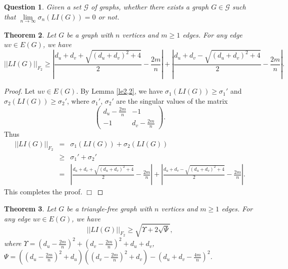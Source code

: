 \documentclass[12pt, a4paper]{article}
\newtheorem{theorem}{Theorem}[section]
\newtheorem{question}[theorem]{Question}
\begin{document}
\begin{question}\label{qu3,2} %
Given a set $\mathcal{G}$ of graphs, whether there exists a graph $G\in \mathcal{G}$ such that $\lim\limits_{n\rightarrow \infty}\sigma_{n}(LI(G))=0$ or not.
\end{question}



\begin{theorem}\label{th3,3} %
Let $G$ be a graph with $n$ vertices and $m\geq 1$ edges. For any edge $uv\in E(G)$, we have
$$||LI(G)||_{F_2}\geq \left\lvert \frac{d_u+d_v+\sqrt{(d_u+d_v)^2+4}}{2}-\frac{2m}{n}\right\lvert+\left\lvert \frac{d_u+d_v-\sqrt{(d_u+d_v)^2+4}}{2}-\frac{2m}{n}\right\lvert.$$
\end{theorem}


\begin{proof}  Let $uv\in E(G)$. By Lemma \ref{le2,2}, we have $\sigma_1(LI(G))\geq \sigma_1'$ and $\sigma_2(LI(G))\geq \sigma_2'$, where $\sigma_1'$, $\sigma_2'$ are the singular values of the matrix
$$\begin{pmatrix}
d_u-\frac{2m}{n} & -1\\
-1 & d_v-\frac{2m}{n}
\end{pmatrix}.$$
Thus
\begin{eqnarray*}
||LI(G)||_{F_2} & = & \sigma_1(LI(G))+\sigma_2(LI(G))\\
& \geq & \sigma_1'+\sigma_2'\\
& = & \left\lvert \frac{d_u+d_v+\sqrt{(d_u+d_v)^2+4}}{2}-\frac{2m}{n}\right\lvert+\left\lvert \frac{d_u+d_v-\sqrt{(d_u+d_v)^2+4}}{2}-\frac{2m}{n}\right\lvert.
\end{eqnarray*}
 This completes the proof. $\Box$
\end{proof}


\begin{theorem}\label{th3,4} %
Let $G$ be a triangle-free graph with $n$ vertices and $m\geq 1$ edges. For any edge $uv\in E(G)$, we have
$$||LI(G)||_{F_2}\geq \sqrt{\Upsilon+2\sqrt{\Psi}},$$
where $\Upsilon=\left(d_u-\frac{2m}{n}\right)^2+\left(d_v-\frac{2m}{n}\right)^2+d_u+d_v$, $\Psi=\left(\left(d_u-\frac{2m}{n}\right)^2+d_u\right)\left(\left(d_v-\frac{2m}{n}\right)^2+d_v\right)-\left(d_u+d_v-\frac{4m}{n}\right)^2$.
\end{theorem}
\end{document}

